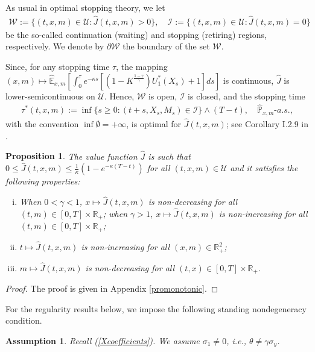 \documentclass[a4paper,11pt]{amsart}
\numberwithin{equation}{section}
\newtheorem{pro}{Proposition}[section]
\newtheorem{assume}{Assumption}[section]
\newcommand{\blue}[1]{{\color{black}#1}}
\begin{document}
{As usual in optimal stopping theory, we let
\begin{align}\label{region}
\mathcal{W}:=\{ (t,x,m) \in \mathcal{U} : \widehat{J}(t, x,m)>0  \}, \quad
\mathcal{I}:=\{ (t,x,m) \in  \mathcal{U} : \widehat{J}(t, x,m)=0  \}
\end{align}
be the so-called continuation (waiting) and stopping (retiring) regions, respectively. We denote by $\partial \mathcal{W}$ the boundary of the set $\mathcal{W}.$


Since, for any stopping time $\tau$, the mapping $(x,m) \mapsto \widehat{\mathbb{E}}_{x,m}[    \int_0^{\tau }  e^{-\kappa s}[ (1-K^{\frac{1-\gamma}{\gamma}}){U}^\ast_1(X_s) +1 ]ds ]$ is continuous, $\widehat{J}$ is lower-semicontinuous on $\mathcal{U}$. Hence, $\mathcal{W}$ is open, $\mathcal{I}$ is closed, and the stopping time 
\begin{align}\label{optimalstopping}
\tau^\ast(t,x,m) := \inf\{s \geq 0 :(t+s,X_s,M_s) \in \mathcal{I}\} \wedge (T-t), \quad \widehat{\mathbb{P}}_{x,m}\text{-}{a.s.},
\end{align}
{with the convention $\inf\emptyset=+\infty$, is optimal for $\widehat J(t,x,m)$; see Corollary I.2.9 in \citet{peskir2006optimal}.}


\begin{pro}\label{monotonic}
The value function $\widehat{J}$ is such that $0\leq \widehat{J}(t,x,m)\leq \frac{1}{\kappa}(1-e^{-\kappa(T-t)})$ for all $(t,x,m) \in \mathcal{U}$ and it satisfies the following properties:
\begin{enumerate}[(i)]
	\item  When $0<\gamma<1$, $x \mapsto \widehat{J}(t,x,m) $ is non-decreasing for all $(t,m)  \in [0,T] \times \mathbb{R}_+$;  when $\gamma>1$, $x \mapsto \widehat{J}(t,x,m) $ is non-increasing for all $(t,m)  \in [0,T] \times \mathbb{R}_+$;
	\item $t \mapsto \widehat{J}(t,x,m) $ is non-increasing for all $(x,m)  \in \mathbb{R}^2_+$;
	\item  $m \mapsto \widehat{J}(t,x,m) $ is non-decreasing for all $(t,x)  \in [0,T] \times \mathbb{R}_+.$
\end{enumerate}
\end{pro}

\begin{proof}
The proof is given in Appendix \ref{promonotonic}.
\end{proof}
\blue{For the regularity results below, we impose the following standing nondegeneracy condition.}
\begin{assume}\label{nondegenerate}
\blue{Recall (\ref{Xcoefficients}). We assume $\sigma_1\neq0$, i.e., $\theta\neq\gamma\sigma_y$}.
\end{assume}

}
\end{document}
